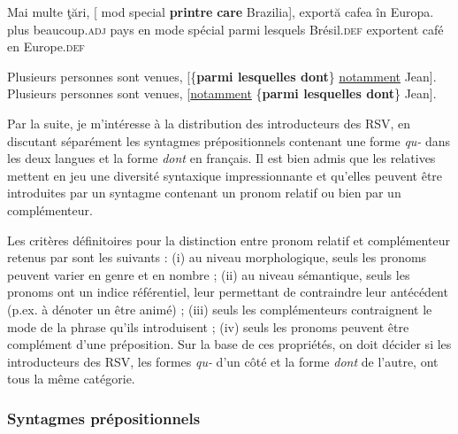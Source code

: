 \ex 
\gll *Mai  multe  ţări,  [  mod  special  \textbf{printre} \textbf{care}  Brazilia], exportă  cafea  în  Europa. \label{ch3:ex10b}\\
plus  beaucoup.\textsc{adj}  pays  en  mode  spécial  parmi lesquels  Brésil.\textsc{def} exportent  café  en  Europe.\textsc{def}\\
\z
\z

\ea \label{ch3:ex11}
\ea Plusieurs personnes sont venues, [\{\textbf{parmi lesquelles {\textbar} dont}\} \uline{notamment} Jean]. \label{ch3:ex11a}
\ex *Plusieurs personnes sont venues, [\uline{notamment} \{\textbf{parmi lesquelles {\textbar} dont}\} Jean]. \label{ch3:ex11b}
\z
\z

Par la suite, je m’intéresse à la distribution des introducteurs des RSV, en discutant séparément les syntagmes prépositionnels contenant une forme \textit{qu-} dans les deux langues et la forme \textit{dont} en français. Il est bien admis que les relatives mettent en jeu une diversité syntaxique impressionnante \citep{Godard1988,AbeilleEtAl2006} et qu’elles peuvent être introduites par un syntagme contenant un pronom relatif ou bien par un complémenteur.

Les critères définitoires pour la distinction entre pronom relatif et complémenteur retenus par \citet{AbeilleEtAl2006} sont les suivants : (i) au niveau morphologique, seuls les pronoms peuvent varier en genre et en nombre ; (ii) au niveau sémantique, seuls les pronoms ont un indice référentiel, leur permettant de contraindre leur antécédent (p.ex. à dénoter un être animé) ; (iii) seuls les complémenteurs contraignent le mode de la phrase qu’ils introduisent ; (iv) seuls les pronoms peuvent être complément d’une préposition. Sur la base de ces propriétés, on doit décider si les introducteurs des RSV, les formes \textit{qu-} d’un côté et la forme \textit{dont} de l’autre, ont tous la même catégorie.  


\subsubsection{Syntagmes prépositionnels}\label{ch3:sect3.2.1.1}

